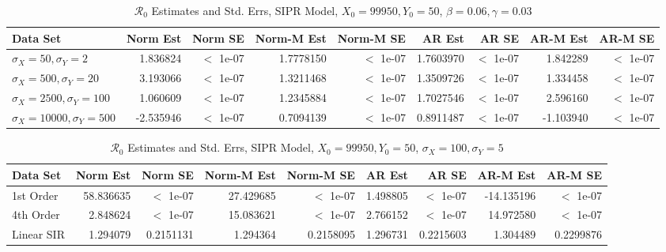 \documentclass[12pt]{article}
\newcommand{\rr}{\ensuremath{\mathcal{R}_0}}
\begin{document}
\begin{table}[H]
	
	\caption{\label{tab:}$\rr$ Estimates and Std. Errs, SIPR Model,
		$X_0 = 99950, Y_0 = 50$, $\beta = 0.06, \gamma = 0.03$}
	\centering
	\begin{footnotesize}
		\begin{tabular}[t]{l|r|r|r|r|r|r|r|r}
			\hline
			Data Set & Norm Est & Norm SE & Norm-M Est & Norm-M SE & AR Est & AR SE & AR-M Est & AR-M SE\\
			\hline
			$\sigma_X = 50, \sigma_Y = 2$ & 1.836824 & $<$ 1e-07 & 1.7778150 & $<$ 1e-07 & 1.7603970 & $<$ 1e-07 & 1.842289 & $<$ 1e-07 \\
			\hline
			$\sigma_X = 500, \sigma_Y = 20$ & 3.193066 & $<$ 1e-07 & 1.3211468 & $<$ 1e-07 & 1.3509726 & $<$ 1e-07 & 1.334458 & $<$ 1e-07 \\
			\hline
			$\sigma_X = 2500, \sigma_Y = 100$ & 1.060609 & $<$ 1e-07 & 1.2345884 & $<$ 1e-07 & 1.7027546 & $<$ 1e-07 & 2.596160 & $<$ 1e-07 \\
			\hline
			$\sigma_X = 10000, \sigma_Y = 500$ & -2.535946 & $<$ 1e-07 & 0.7094139 & $<$ 1e-07 & 0.8911487 & $<$ 1e-07 & -1.103940 & $<$ 1e-07 \\
			\hline
		\end{tabular}
	\end{footnotesize}
\end{table}

\begin{table}[H]
	
	\caption{\label{tab:}$\rr$ Estimates and Std. Errs, SIPR Model,
		$X_0 = 99950, Y_0 = 50$, $\sigma_X = 100, \sigma_Y = 5$}
	\centering
	\begin{footnotesize}
		\begin{tabular}[t]{l|r|r|r|r|r|r|r|r}
			\hline
			Data Set & Norm Est & Norm SE & Norm-M Est & Norm-M SE & AR Est & AR SE & AR-M Est & AR-M SE\\
			\hline
			1st Order & 58.836635 & $<$ 1e-07 & 27.429685 & $<$ 1e-07 & 1.498805 & $<$ 1e-07 & -14.135196 & $<$ 1e-07 \\
			\hline
			4th Order & 2.848624 & $<$ 1e-07 & 15.083621 & $<$ 1e-07 & 2.766152 & $<$ 1e-07 & 14.972580 & $<$ 1e-07 \\
			\hline
			Linear SIR & 1.294079 & 0.2151131 & 1.294364 & 0.2158095 & 1.296731 & 0.2215603 & 1.304489 & 0.2299876\\
			\hline
		\end{tabular}
	\end{footnotesize}
\end{table}
\end{document}
